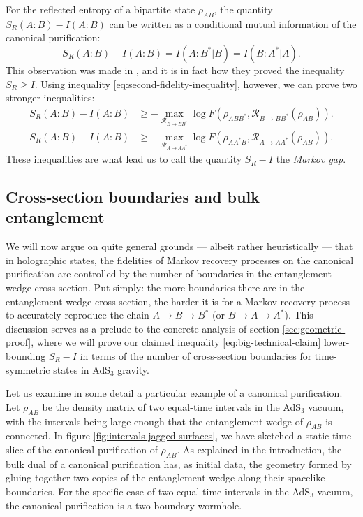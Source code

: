 \documentclass[a4paper,11pt]{article}
\begin{document}
For the reflected entropy of a bipartite state $\rho_{AB}$, the quantity $S_R(A:B) - I(A:B)$ can be written as a conditional mutual information of the canonical purification:
\begin{equation}
    S_R(A:B) - I(A:B) = I(A:B^*|B) = I(B:A^*|A).
\end{equation}
This observation was made in \cite{dutta-faulkner}, and it is in fact how they proved the inequality $S_R \geq I$. Using inequality \eqref{eq:second-fidelity-inequality}, however, we can prove two stronger inequalities:
\begin{align}
    S_R(A:B) - I(A:B) \label{eq:BBstar-Markov}
        & \geq - \max_{\mathcal{R}_{B \rightarrow B B^*}} \log F(\rho_{A B B^*}, \mathcal{R}_{B \rightarrow B B^*}(\rho_{AB})). \\
    S_R(A:B) - I(A:B)
        & \geq - \max_{\mathcal{R}_{A \rightarrow A A^*}} \log F(\rho_{A A^* B}, \mathcal{R}_{A \rightarrow A A^*}(\rho_{AB})).
\end{align}
These inequalities are what lead us to call the quantity $S_R - I$ the \emph{Markov gap}.

\subsection{Cross-section boundaries and bulk entanglement}
\label{subsec:bulk-gap}

We will now argue on quite general grounds --- albeit rather heuristically --- that in holographic states, the fidelities of Markov recovery processes on the canonical purification are controlled by the number of boundaries in the entanglement wedge cross-section. Put simply: the more boundaries there are in the entanglement wedge cross-section, the harder it is for a Markov recovery process to accurately reproduce the chain $A \rightarrow B \rightarrow B^*$ (or $B \rightarrow A \rightarrow A^*$). This discussion serves as a prelude to the concrete analysis of section \ref{sec:geometric-proof}, where we will prove our claimed inequality \eqref{eq:big-technical-claim} lower-bounding $S_R - I$ in terms of the number of cross-section boundaries for time-symmetric states in AdS$_3$ gravity.

Let us examine in some detail a particular example of a canonical purification. Let $\rho_{AB}$ be the density matrix of two equal-time intervals in the AdS$_3$ vacuum, with the intervals being large enough that the entanglement wedge of $\rho_{AB}$ is connected. In figure \ref{fig:intervals-jagged-surfaces}, we have sketched a static time-slice of the canonical purification of $\rho_{AB}$. As explained in the introduction, the bulk dual of a canonical purification has, as initial data, the geometry formed by gluing together two copies of the entanglement wedge along their spacelike boundaries. For the specific case of two equal-time intervals in the AdS$_3$ vacuum, the canonical purification is a two-boundary wormhole.
\end{document}
